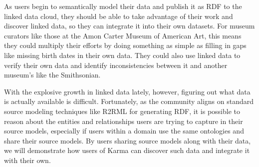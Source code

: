 As users begin to semantically model their data and publish it as RDF to the linked data cloud, they should be able to take advantage of their work and discover linked data, so they can integrate it into their own datasets.  
For museum curators like those at the Amon Carter Museum of American Art, this means they could multiply their efforts by doing something as simple as filling in gaps like missing birth dates in their own data. 
They could also use linked data to verify their own data and identify inconsistencies between it and another museum's like the Smithsonian.

With the explosive growth in linked data lately, however, figuring out what data is actually available is difficult.
Fortunately, as the community aligns on standard source modeling techniques like R2RML for generating RDF, it is possible to reason about the entities and relationships users are trying to capture in their source models, especially if users within a domain use the same ontologies and share their source models.
By users sharing source models along with their data, we will demonstrate how users of Karma can discover such data and integrate it with their own.
